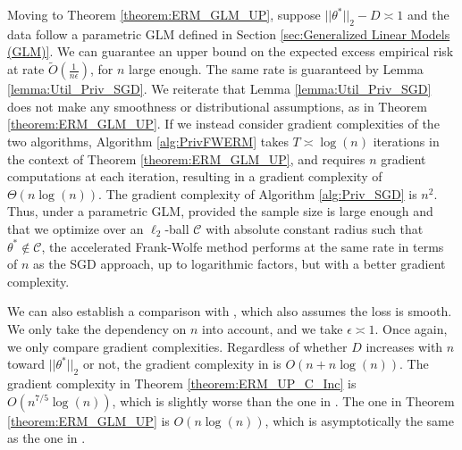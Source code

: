 \documentclass{article}
\begin{document}
Moving to Theorem \ref{theorem:ERM_GLM_UP}, suppose $||\theta^*||_2 - D \asymp 1$ and the data follow a parametric GLM defined in Section \ref{sec:Generalized Linear Models (GLM)}. We can guarantee an upper bound on the expected excess empirical risk at rate $\widetilde{O}\left(\frac{1}{n\epsilon}\right)$, for $n$ large enough. The same rate is guaranteed by Lemma \ref{lemma:Util_Priv_SGD}. We reiterate that Lemma \ref{lemma:Util_Priv_SGD} does not make any smoothness or distributional assumptions, as in Theorem \ref{theorem:ERM_GLM_UP}. If we instead consider gradient complexities of the two algorithms, Algorithm \ref{alg:PrivFWERM} takes $T \asymp \log(n)$ iterations in the context of Theorem \ref{theorem:ERM_GLM_UP}, and requires $n$ gradient computations at each iteration, resulting in a gradient complexity of $\Theta(n\log(n))$. The gradient complexity of Algorithm \ref{alg:Priv_SGD} is $n^2$. Thus, under a parametric GLM, provided the sample size is large enough and that we optimize over an $\ell_2$-ball $\mathcal{C}$ with absolute constant radius such that $\theta^* \notin \mathcal{C}$, the accelerated Frank-Wolfe method performs at the same rate in terms of $n$ as the SGD approach, up to logarithmic factors, but with a better gradient complexity.

We can also establish a comparison with \cite{DP_ERM_Faster}, which also assumes the loss is smooth. We only take the dependency on $n$ into account, and we take $\epsilon \asymp 1$. Once again, we only compare gradient complexities. Regardless of whether $D$ increases with $n$ toward $||\theta^*||_2$ or not, the gradient complexity in \cite{DP_ERM_Faster} is $O\left(n + n\log(n)\right)$. The gradient complexity in Theorem \ref{theorem:ERM_UP_C_Inc} is $O\left(n^{7/5}\log(n)\right)$, which is slightly worse than the one in \cite{DP_ERM_Faster}. The one in Theorem \ref{theorem:ERM_GLM_UP} is $O\left(n\log(n)\right)$, which is asymptotically the same as the one in \cite{DP_ERM_Faster}.




\end{document}
